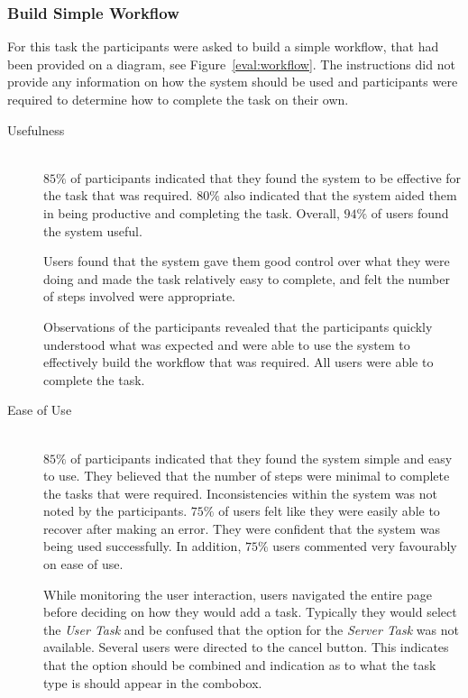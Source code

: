 \documentclass[12pt,a4paper]{report}
\begin{document}
\subsubsection{Build Simple Workflow\label{eval:simple}}
For this task the participants were asked to build a simple workflow, that had
been provided on a diagram, see Figure~\ref{eval:workflow}. The instructions
did not provide any information on how the system should be used and
participants were required to determine how to complete the task on their own.
\begin{description}
\item[Usefulness] \hfill \\
    $85\%$ of participants indicated that they found the system to be
    effective for the task that was required. $80\%$ also indicated that
    the system aided them in being productive and completing the task.
    Overall, $94\%$ of users found the system useful.

    Users found that the system gave them good control over what they were doing and
    made the task relatively easy to complete, and felt the number of steps
    involved were appropriate. 

    Observations of the participants revealed that the participants quickly
    understood what was expected and were able to use the system to
    effectively build the workflow that was required. All users were able to
    complete the task.
\item[Ease of Use] \hfill \\
    $85\%$ of participants indicated that they found the system simple and easy to use.
    They believed that the number of steps were minimal to complete the tasks
    that were required. Inconsistencies within the system was not noted by 
    the participants. $75\%$ of users felt like they were easily able to recover after
    making an error. They were confident that the system was being used
    successfully. In addition, $75\%$ users commented very favourably on
    ease of use.

    While monitoring the user interaction, users navigated the entire page before
    deciding on how they would add a task. Typically they would select the
    \emph{User Task} and be confused that the option for the \emph{Server Task}
    was  not available. Several users were directed to the cancel button. This
    indicates that the option should be combined and indication as to what the
    task type is should appear in the combobox. 
    

\end{description}
\end{document}
